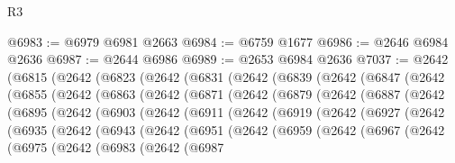\begin{lexlean}{R3}
\begin{coremodule}
@6983 := @6979 @6981 @2663
@6984 := @6759 @1677
@6986 := @2646 @6984 @2636
@6987 := @2644 @6986
@6989 := @2653 @6984 @2636
@7037 := @2642
    (@6815
      (@2642
        (@6823
          (@2642
            (@6831
              (@2642
                (@6839
                  (@2642
                    (@6847
                      (@2642
                        (@6855
                          (@2642
                            (@6863
                              (@2642
                                (@6871
                                  (@2642
                                    (@6879
                                      (@2642
                                        (@6887
                                          (@2642
                                            (@6895
                                              (@2642
                                                (@6903
                                                  (@2642
                                                    (@6911
                                                      (@2642
                                                        (@6919
                                                          (@2642
                                                            (@6927
                                                              (@2642
                                                                (@6935
                                                                  (@2642
                                                                    (@6943
                                                                      (@2642
                                                                        (@6951
                                                                          (@2642
                                                                            (@6959
                                                                              (@2642
                                                                                (@6967
                                                                                  (@2642
                                                                                    (@6975
                                                                                      (@2642
                                                                                        (@6983
                                                                                          (@2642
                                                                                            (@6987

\end{coremodule}
\end{lexlean}
